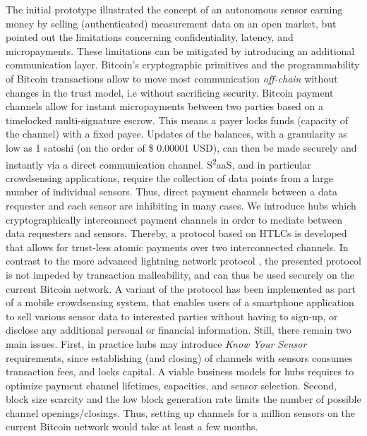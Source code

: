 The initial prototype illustrated the concept of an autonomous sensor earning money by selling (authenticated) measurement data on an open market, but pointed out the limitations concerning confidentiality, latency, and micropayments. These limitations can be mitigated by introducing an additional communication layer. Bitcoin's cryptographic primitives and the programmability of Bitcoin transactions allow to move most communication \emph{off-chain} without changes in the trust model, i.e without sacrificing security. Bitcoin payment channels allow for instant micropayments between two parties based on a timelocked multi-signature escrow. This means a payer locks funds (capacity of the channel) with a fixed payee. Updates of the balances, with a granularity as low as 1 satoshi (on the order of \$ 0.00001 USD), can then be made securely and instantly via a direct communication channel. S\textsuperscript{2}aaS, and in particular crowdsensing applications, require the collection of data points from a large number of individual sensors. Thus, direct payment channels between a data requester and each sensor are inhibiting in many cases. We introduce hubs which cryptographically interconnect payment channels in order to mediate between data requesters and sensors. Thereby, a protocol based on \ac{HTLC}s is developed that allows for trust-less atomic payments over two interconnected channels. In contrast to the more advanced lightning network protocol \parencite{poonbitcoin}, the presented protocol is not impeded by transaction malleability, and can thus be used securely on the current Bitcoin network. A variant of the protocol has been implemented as part of a mobile crowdsensing system, that enables users of a smartphone application to sell various sensor data to interested parties without having to sign-up, or disclose any additional personal or financial information. Still, there remain two main issues. First, in practice hubs may introduce \emph{Know Your Sensor} requirements, since establishing (and closing) of channels with sensors consumes transaction fees, and locks capital. A viable business models for hubs requires to optimize payment channel lifetimes, capacities, and sensor selection. Second, block size scarcity and the low block generation rate limits the number of possible channel openings/closings. Thus, setting up channels for a million sensors on the current Bitcoin network would take at least a few months.

